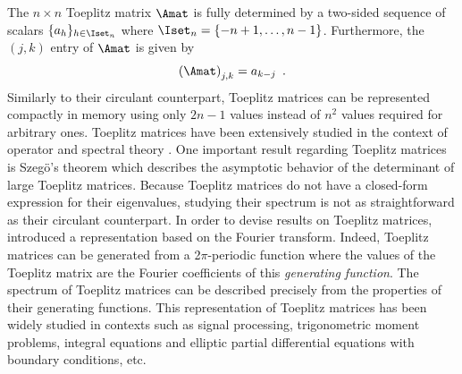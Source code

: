 \noindent
The $n \times n$ Toeplitz matrix $\Amat$ is fully determined by a two-sided sequence of scalars $\{a_h\}_{h \in \Iset_n}$ where $\Iset_n = \{-n+1, \dots, n-1\}$.
Furthermore, the $(j,k)$ entry of $\Amat$ is given by
\begin{equation}
  \leftmat \Amat \rightmat_{j,k} = a_{k-j} \enspace.
\end{equation}
\noindent
Similarly to their circulant counterpart, Toeplitz matrices can be represented compactly in memory using only $2n-1$ values instead of $n^2$ values required for arbitrary ones.
Toeplitz matrices have been extensively studied in the context of operator and spectral theory \cite{grenander1958toeplitz,widom1965toeplitz,bottcher2012introduction}.
One important result regarding Toeplitz matrices is Szeg\"{o}'s theorem \cite{szego1915grenzwertsatz} which describes the asymptotic behavior of the determinant of large Toeplitz matrices.
Because Toeplitz matrices do not have a closed-form expression for their eigenvalues, studying their spectrum is not as straightforward as their circulant counterpart.
In order to devise results on Toeplitz matrices, \citet{grenander1958toeplitz} introduced a representation based on the Fourier transform.
Indeed, Toeplitz matrices can be generated from a 2$\pi$-periodic function where the values of the Toeplitz matrix are the Fourier coefficients of this \emph{generating function}.
The spectrum of Toeplitz matrices can be described precisely from the properties of their generating functions.
This representation of Toeplitz matrices has been widely studied in contexts such as signal processing, trigonometric moment problems, integral equations and elliptic partial differential equations with boundary conditions, etc. \cite{serra1997extension,parter1961extreme,avram1988bilinear,widom1965toeplitz,tilli1997asymptotic,tyrtyshnikov1998spectra,tilli1998singular,tilli1997asymptotic} 



%
%
%
%


